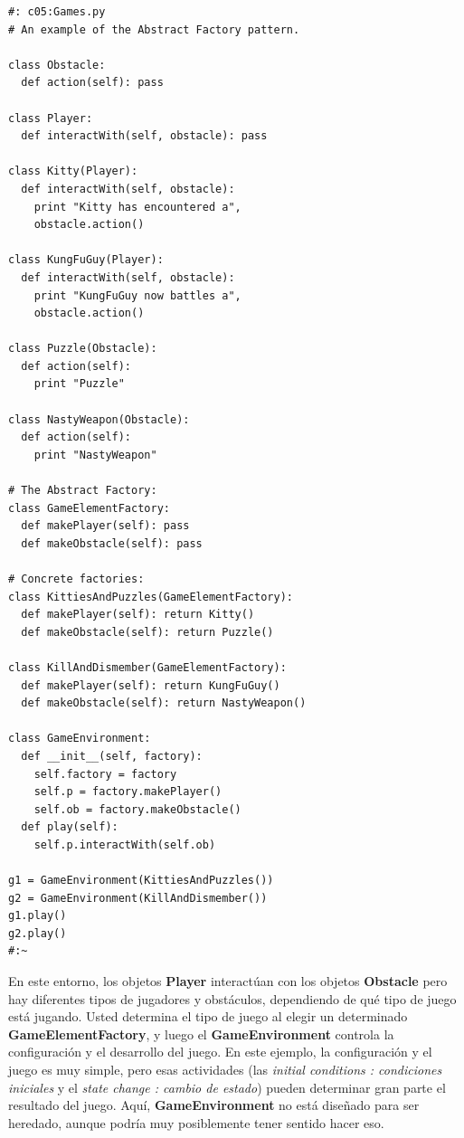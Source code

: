 \documentclass{article}
\begin{document}
\begin{lstlisting} 
#: c05:Games.py 
# An example of the Abstract Factory pattern. 

class Obstacle: 
  def action(self): pass 
  
class Player: 
  def interactWith(self, obstacle): pass 
  
class Kitty(Player): 
  def interactWith(self, obstacle): 
    print "Kitty has encountered a", 
    obstacle.action() 
    
class KungFuGuy(Player): 
  def interactWith(self, obstacle): 
    print "KungFuGuy now battles a", 
    obstacle.action() 
    
class Puzzle(Obstacle): 
  def action(self):  
    print "Puzzle"  
    
class NastyWeapon(Obstacle): 
  def action(self):  
    print "NastyWeapon"  
    
# The Abstract Factory: 
class GameElementFactory: 
  def makePlayer(self): pass 
  def makeObstacle(self): pass 
  
# Concrete factories: 
class KittiesAndPuzzles(GameElementFactory): 
  def makePlayer(self): return Kitty() 
  def makeObstacle(self): return Puzzle()   
  
class KillAndDismember(GameElementFactory): 
  def makePlayer(self): return KungFuGuy() 
  def makeObstacle(self): return NastyWeapon()
  
class GameEnvironment: 
  def __init__(self, factory): 
    self.factory = factory 
    self.p = factory.makePlayer()  
    self.ob = factory.makeObstacle() 
  def play(self):  
    self.p.interactWith(self.ob)  
    
g1 = GameEnvironment(KittiesAndPuzzles()) 
g2 = GameEnvironment(KillAndDismember()) 
g1.play()  
g2.play()  
#:~     
\end{lstlisting}

En este entorno, los objetos \textbf{Player} interactúan con los objetos \textbf{Obstacle} pero hay diferentes tipos de jugadores y obstáculos, dependiendo de qué tipo de juego está jugando. Usted determina el tipo de juego al elegir un determinado \textbf{GameElementFactory}, y luego el \textbf{GameEnvironment} controla la configuración y el desarrollo del juego. En este ejemplo, la configuración y el juego es muy simple, pero esas actividades (las \textit{initial conditions : condiciones iniciales} y el \textit{state change : cambio de estado}) pueden determinar gran parte el resultado del juego. Aquí, \textbf{GameEnvironment} no está diseñado para ser heredado, aunque podría muy posiblemente tener sentido hacer eso.      \newline
\end{document}
